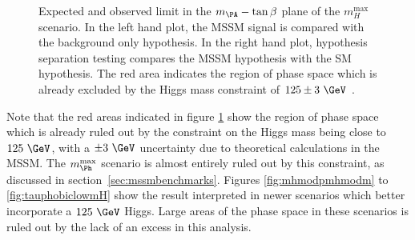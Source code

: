 \begin{figure}[tbh]
\caption{Expected and observed limit in the $m_{\PA}-\tan\beta$ plane of the
$m_H^{\text{max}}$ scenario. In the left hand plot, the \ac{MSSM} signal is
compared with the background only hypothesis. In the right hand plot, hypothesis
separation testing compares the \ac{MSSM} hypothesis with the SM
hypothesis. The red area indicates the region of phase space which is already
excluded by the Higgs mass constraint of $125\pm3~\GeV$ \cite{HIG-13-021-twiki,HIG-13-021}.}
\label{fig:hypotestcompare}
\end{figure}


Note that the red areas indicated in figure \ref{fig:hypotestcompare} show the
region of phase space which is already ruled out by the constraint on the Higgs
mass being close to $125~\GeV$, with a $\pm 3~\GeV$ uncertainty due to
theoretical calculations in the \ac{MSSM}. The $m_{\Ph}^{\text{max}}$ scenario
is almost entirely ruled out by this constraint, as discussed in
section~\ref{sec:mssmbenchmarks}. Figures \ref{fig:mhmodpmhmodm} to \ref{fig:tauphobiclowmH}
show the result interpreted in newer scenarios which better incorporate a
$125~\GeV$ Higgs. Large areas of the phase space in these scenarios is ruled out
by the lack of an excess in this analysis.



